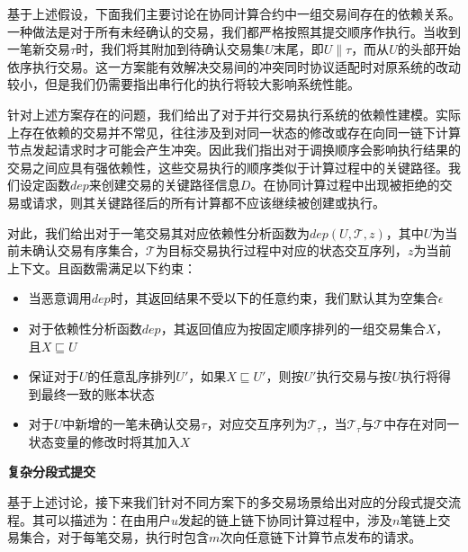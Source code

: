基于上述假设，下面我们主要讨论在协同计算合约中一组交易间存在的依赖关系。一种做法是对于所有未经确认的交易，我们都严格按照其提交顺序作执行。当收到一笔新交易$\tau$时，我们将其附加到待确认交易集$U$末尾，即$U\parallel\tau$，而从$U$的头部开始依序执行交易。这一方案能有效解决交易间的冲突同时协议适配时对原系统的改动较小，但是我们仍需要指出串行化的执行将较大影响系统性能。

针对上述方案存在的问题，我们给出了对于并行交易执行系统的依赖性建模。实际上存在依赖的交易并不常见，往往涉及到对同一状态的修改或存在向同一链下计算节点发起请求时才可能会产生冲突。因此我们指出对于调换顺序会影响执行结果的交易之间应具有强依赖性，这些交易执行的顺序类似于计算过程中的关键路径。我们设定函数$dep$来创建交易的关键路径信息$D$。在协同计算过程中出现被拒绝的交易或请求，则其关键路径后的所有计算都不应该继续被创建或执行。

对此，我们给出对于一笔交易其对应依赖性分析函数为$dep(U, \mathcal{T}, z)$，其中$U$为当前未确认交易有序集合，$\mathcal{T}$为目标交易执行过程中对应的状态交互序列，$z$为当前上下文。且函数需满足以下约束：
\begin{itemize}
\setlength{\itemsep}{0pt}
\setlength{\parsep}{0pt}
\setlength{\parskip}{0pt}
    \item 当恶意调用$dep$时，其返回结果不受以下的任意约束，我们默认其为空集合$\epsilon$
    \item 对于依赖性分析函数$dep$，其返回值应为按固定顺序排列的一组交易集合$X$，且$X \sqsubseteq U$
    \item 保证对于$U$的任意乱序排列$U'$，如果$X \sqsubseteq U'$，则按$U'$执行交易与按$U$执行将得到最终一致的账本状态
    \item 对于$U$中新增的一笔未确认交易$\tau$，对应交互序列为$\mathcal{T}_\tau$，当$\mathcal{T}_\tau$与$\mathcal{T}$中存在对同一状态变量的修改时将其加入$X$
\end{itemize}

\noindent\textbf{复杂分段式提交}

基于上述讨论，接下来我们针对不同方案下的多交易场景给出对应的分段式提交流程。其可以描述为：在由用户$u$发起的链上链下协同计算过程中，涉及$n$笔链上交易集合，对于每笔交易，执行时包含$m$次向任意链下计算节点发布的请求。

